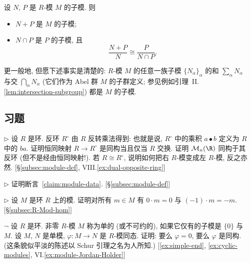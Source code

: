\begin{proposition}
\label{prop:module-second-iso}
设 $N$, $P$ 是 $R$-模 $M$ 的子模. 则
\begin{itemize}
	\item $N + P$ 是 $M$ 的子模;
	\item $N \cap P$ 是 $P$ 的子模, 且
	\[
	\frac{N + P}{N} \cong \frac{P}{N \cap P}.
	\]
\end{itemize}
\end{proposition}

更一般地, 但愿下述事实是清楚的: $R$-模 $M$ 的任意一族子模 $\{N_{\alpha}\}_{\alpha}$ 的和 $\sum_{\alpha} N_{\alpha}$ 与交 $\bigcap_{\alpha} N_{\alpha}$ (它们作为 Abel 群 $M$ 的子群定义; 参见例如引理~II.\ref{lem:intersection-subgroup}) 都是 $M$ 的子模.

\subsection*{习题}
{}

\begin{prob}
\label{ex:opposite-ring}
$\triangleright$ 设 $R$ 是环. 反环 $R^{\circ}$ 由 $R$ 反转乘法得到: 也就是说, $R^{\circ}$ 中的乘积 $a \bullet b$ 定义为 $R$ 中的 $ba$. 证明恒同映射 $R \to R^{\circ}$ 是同构当且仅当 $R$ 交换. 证明 $\mathcal{M}_n(\R)$ 同构于其反环 (但不是经由恒同映射!). 若 $R \cong R^{\circ}$, 说明如何把右 $R$-模变成左 $R$-模, 反之亦然. [\S\ref{subsec:module-def}, VIII.\ref{ex:dual-opposite-ring}]
\end{prob}

\begin{prob}
\label{ex:claim-module}
$\triangleright$ 证明断言~\ref{claim:module-data}. [\S\ref{subsec:module-def}]
\end{prob}

\begin{prob}
\label{ex:module-basic}
$\triangleright$ 设 $M$ 是环 $R$ 上的模. 证明对所有 $m \in M$ 有 $0 \cdot m = 0$ 与 $(-1) \cdot m = -m$. [\S\ref{subsec:R-Mod-hom}]
\end{prob}

\begin{prob}
\label{ex:simple-modules}
$\neg$ 设 $R$ 是环. 非零 $R$-模 $M$ 称为单的%
(或不可约的), 如果它仅有的子模是 $\{0\}$ 与 $M$. 设 $M$, $N$ 是单模, $\varphi : M \to N$ 是 $R$-模同态. 证明: 要么 $\varphi = 0$, 要么 $\varphi$ 是同构. (这条貌似平淡的陈述以 Schur 引理之名为人所知.) [\ref{ex:simple-end}, \ref{ex:cyclic-modules}, VI.\ref{ex:module-Jordan-Holder}]
\end{prob}

